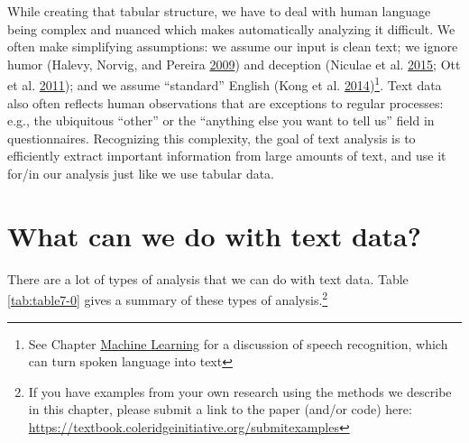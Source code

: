 \documentclass[]{krantz}
\begin{document}
While creating that tabular structure, we have to deal with human
language being complex and nuanced which makes automatically analyzing
it difficult. We often make simplifying assumptions: we assume our input
is clean text; we ignore humor (Halevy, Norvig, and Pereira
\protect\hyperlink{ref-halevy-09}{2009}) and deception (Niculae et al.
\protect\hyperlink{ref-niculae-15}{2015}; Ott et al.
\protect\hyperlink{ref-ott-11}{2011}); and we assume ``standard''
English (Kong et al. \protect\hyperlink{ref-kong-14}{2014})\footnote{See
  Chapter \protect\hyperlink{chap:ml}{Machine Learning} for a discussion
  of speech recognition, which can turn spoken language into text}. Text
data also often reflects human observations that are exceptions to
regular processes: e.g., the ubiquitous ``other'' or the ``anything else
you want to tell us'' field in questionnaires. Recognizing this
complexity, the goal of text analysis is to efficiently extract
important information from large amounts of text, and use it for/in our
analysis just like we use tabular data.

\section{What can we do with text
data?}\label{what-can-we-do-with-text-data}

There are a lot of types of analysis that we can do with text data.
Table \ref{tab:table7-0} gives a summary of these types of
analysis.\footnote{If you have examples from your own research using the
  methods we describe in this chapter, please submit a link to the paper
  (and/or code) here:
  \url{https://textbook.coleridgeinitiative.org/submitexamples}}
\end{document}
